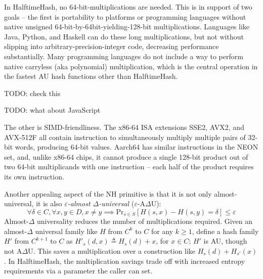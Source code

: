\documentclass[sigconf, nonacm]{acmart}
\begin{document}
In HalftimeHash, no 64-bit-mul\-ti\-pli\-ca\-tions are needed.
This is in support of two goals --
the first is portability to platforms or programming languages without native unsigned 64-bit-by-64bit-yielding-128-bit multiplications.
Languages like Java, Python, and Haskell can do these long multiplications, but not without slipping into arbitrary-precision-integer code, decreasing performance substantially.
Many programming languages do not include a way to perform native carryless (aka polynomial) multiplication, which is the central operation in the fastest AU hash functions other than HalftimeHash. \cite{umash,clhash}

TODO: check this

TODO: what about JavaScript

The other is SIMD-friendliness.
The x86-64 ISA extensions SSE2, AVX2, and AVX-512F all contain instruction to simultaneously multiply multiple pairs of 32-bit words, producing 64-bit values.
Aarch64 has similar instructions in the NEON set, and, unlike x86-64 chips, it cannot produce a single 128-bit product out of two 64-bit multiplicands with one instruction -- each half of the product requires its own instruction.



Another appealing aspect of the NH primitive is that it is not only almost-universal, it is also {\em$ \varepsilon$-almost $\Delta$-universal} ($\varepsilon$-A$\Delta$U):
\[\forall \delta \in C, \forall x,y \in D, x \neq y \implies \mathrm{Pr}_{s \in S}[H(s, x) - H(s, y) = \delta] \leq \varepsilon \]
Almost-$\Delta$ universality reduces the number of multiplications required.
Given an almost-$\Delta$ universal family like $H$ from $C^k$ to $C$ for any $k \geq 1$, define a hash family $H'$ from $C^{k+1}$ to $C$ as $H'_s (d, x) \triangleq H_s(d) + x$, for $x \in C$; $H'$ is AU, though not A$\Delta$U.
This saves a multiplication over a construction like $H_s(d) + H_{s'}(x)$.
In HalftimeHash, the multiplication savings trade off with increased entropy requirements via a parameter the caller can set.
\end{document}
